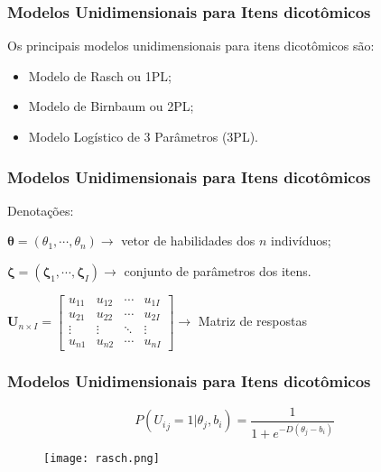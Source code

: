 \documentclass{beamer}
\begin{document}
	
	\begin{frame}
		
		\frametitle{Modelos Unidimensionais para Itens dicotômicos}
		
		Os principais modelos unidimensionais para itens dicotômicos são:\newline
		
		\begin{itemize}
			\item<1-> Modelo de Rasch ou 1PL;
			\item<1-> Modelo de Birnbaum ou 2PL;
			\item<1-> Modelo Logístico de 3 Parâmetros (3PL).
			
		\end{itemize}
	\end{frame}
	
		\begin{frame}
		
		\frametitle{Modelos Unidimensionais para Itens dicotômicos }
		
		\begin{center}
			Denotações:
		\end{center}
		
		$ \boldsymbol{\theta} = (\theta_1, \cdots, \theta_n) \rightarrow $  vetor de habilidades dos $n$ indivíduos; \newline
		
		$ \boldsymbol{\zeta} = (\boldsymbol{\zeta}_1, \cdots, \boldsymbol{\zeta}_I) \rightarrow $ conjunto de parâmetros dos itens.\newline
		
		$ \textbf{U}_{n\times I} =  
		\begin{bmatrix}
			u_{11} & u_{12} & \cdots & u_{1I} \\
			u_{21} & u_{22} & \cdots & u_{2I} \\
			\vdots & \vdots & \ddots & \vdots\\
			u_{n1} & u_{n2} & \cdots & u_{nI}
		\end{bmatrix} \rightarrow
		$ Matriz de respostas
		
		
		
	\end{frame}
	
	\begin{frame}
		
		\frametitle{Modelos Unidimensionais para Itens dicotômicos}
		
		\[
				P({U_i}_j = 1|{\theta}_j, b_i) = 
				\frac{1}{1+e^{-D(\theta_j - b_i)}}
		\]
		\begin{figure}
		\texttt{[image: rasch.png]}
		\end{figure}

	\end{frame}
	
\end{document}
